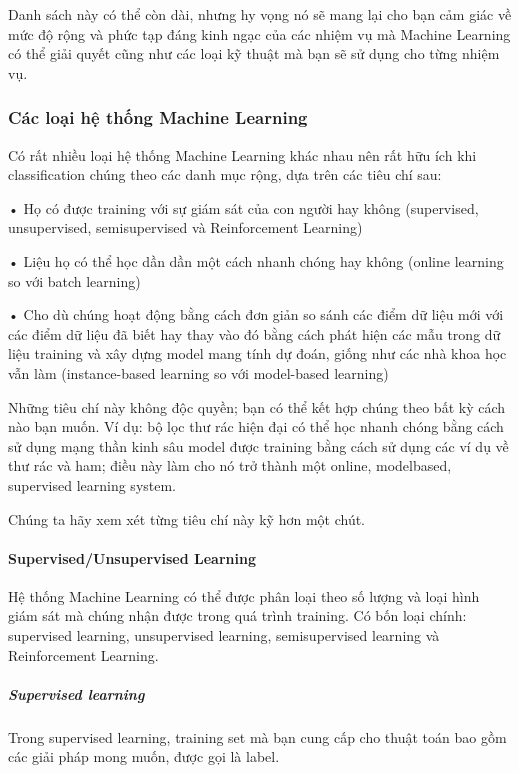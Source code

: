 Danh sách này có thể còn dài, nhưng hy vọng nó sẽ mang lại cho bạn cảm giác về mức độ rộng và phức tạp đáng kinh ngạc của các nhiệm vụ mà Machine Learning có thể giải quyết cũng như các loại kỹ thuật mà bạn sẽ sử dụng cho từng nhiệm vụ.

\subsubsection{Các loại hệ thống Machine Learning}

Có rất nhiều loại hệ thống Machine Learning khác nhau nên rất hữu ích khi classification chúng theo các danh mục rộng, dựa trên các tiêu chí sau:

• Họ có được training với sự giám sát của con người hay không (supervised, unsupervised, semisupervised và Reinforcement Learning)

• Liệu họ có thể học dần dần một cách nhanh chóng hay không (online learning so với batch learning)

• Cho dù chúng hoạt động bằng cách đơn giản so sánh các điểm dữ liệu mới với các điểm dữ liệu đã biết hay thay vào đó bằng cách phát hiện các mẫu trong dữ liệu training và xây dựng model mang tính dự đoán, giống như các nhà khoa học vẫn làm (instance-based learning so với model-based learning)

Những tiêu chí này không độc quyền; bạn có thể kết hợp chúng theo bất kỳ cách nào bạn muốn. Ví dụ: bộ lọc thư rác hiện đại có thể học nhanh chóng bằng cách sử dụng mạng thần kinh sâu model được training bằng cách sử dụng các ví dụ về thư rác và ham; điều này làm cho nó trở thành một online, modelbased, supervised learning system.

Chúng ta hãy xem xét từng tiêu chí này kỹ hơn một chút.

\paragraph{Supervised/Unsupervised Learning}

Hệ thống Machine Learning có thể được phân loại theo số lượng và loại hình giám sát mà chúng nhận được trong quá trình training. Có bốn loại chính: supervised learning, unsupervised learning, semisupervised learning và Reinforcement Learning.

\subparagraph{Supervised learning}

Trong supervised learning, training set mà bạn cung cấp cho thuật toán bao gồm các giải pháp mong muốn, được gọi là label.

